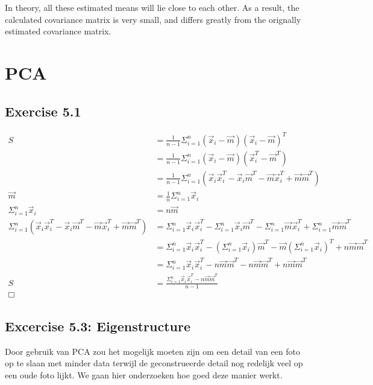 \documentclass{article}
\begin{document}
\inputminted{text}{variance_22.txt}

In theory, all these estimated means will lie close to each other. As a result,
the calculated covariance matrix is very small, and differs greatly from the
orignally estimated covariance matrix.

\section{PCA}

\subsection{Exercise 5.1}

\begin{align*}
    S &= \frac1{n-1} \Sigma^n_{i=1} (\vec x_i - \vec m)(\vec x_i - \vec m)^T \\
      &= \frac1{n-1} \Sigma^n_{i=1} (\vec x_i - \vec m)(\vec x_i^T - \vec m^T)
    \\
      &= \frac1{n-1} \Sigma^n_{i=1} \left(\vec x_i \vec x_i^T - \vec x_i \vec
m^T - \vec m \vec x_i^T + \vec m \vec m ^T\right) \\
    \vec m &= \frac1n \Sigma^n_{i=1} \vec x_i \\
    \Sigma^n_{i=1} \vec x_i &= n \vec m \\
    \Sigma^n_{i=1} \left(\vec x_i \vec x_i^T - \vec x_i \vec m^T - \vec m \vec
    x_i^T + \vec m \vec m^T\right) &= \Sigma^n_{i=1} \vec x_i \vec x_i^T -
        \Sigma^n_{i=1} \vec x_i \vec m^T - \Sigma^n_{i=1} \vec m \vec
    x_i^T + \Sigma^n_{i=1} \vec m \vec m^T \\
    &= \Sigma^n_{i=1} \vec x_i \vec x_i^T - \left(\Sigma^n_{i=1} \vec x_i\right)
    \vec m^T - \vec m \left(\Sigma^n_{i=1} \vec x_i\right)^T + n \vec m \vec m^T
    \\
    &= \Sigma^n_{i=1} \vec x_i \vec x_i^T - n \vec m \vec m^T - n \vec m \vec
    m^T + n \vec m \vec m^T \\
    S &= \frac{\Sigma^n_{i=1} \vec x_i \vec x_i^T - n \vec m \vec m^T}{n-1} \\
    \Box
\end{align*}


\subsection{Excercise 5.3: Eigenstructure}
Door gebruik van PCA zou het mogelijk moeten zijn om een detail van een foto op
te slaan met minder data terwijl de geconstrueerde detail nog redelijk veel op
een oude foto lijkt. We gaan hier onderzoeken hoe goed deze manier werkt.
\end{document}
